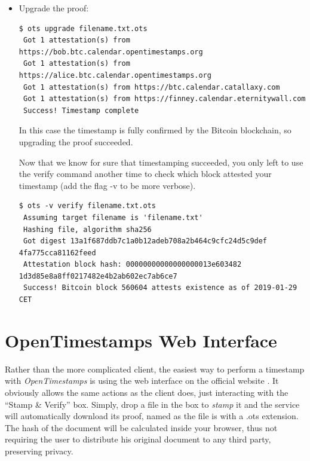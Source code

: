 \begin{itemize}
\begin{lstlisting}[breakatwhitespace=true]
\end{lstlisting}
Incomplete timestamps can be upgraded using the \colorbox{light-gray}{upgrade} command which adds the path to the relative block header merkleroot to the proof. Upgrading a proof isn't always available: there must be at least one completed attestation\footnote{That is, at least one of the four public calendars in question must have received an attestation from the Bitcoin blockchain.}.
\item Upgrade the proof: \bigskip
\begin{lstlisting}[breakatwhitespace=true]
 $ ots upgrade filename.txt.ots 
 Got 1 attestation(s) from https://bob.btc.calendar.opentimestamps.org
 Got 1 attestation(s) from https://alice.btc.calendar.opentimestamps.org
 Got 1 attestation(s) from https://btc.calendar.catallaxy.com
 Got 1 attestation(s) from https://finney.calendar.eternitywall.com
 Success! Timestamp complete
\end{lstlisting}
In this case the timestamp is fully confirmed by the Bitcoin blockchain, so upgrading the proof succeeded.

\bigskip
\noindent
Now that we know for sure that timestamping succeeded, you only left to use the \colorbox{light-gray}{verify} command another time to check which block attested your timestamp (add the flag \colorbox{light-gray}{-v} to be more verbose).\bigskip
\begin{lstlisting}[breakatwhitespace=true]
 $ ots -v verify filename.txt.ots
 Assuming target filename is 'filename.txt'
 Hashing file, algorithm sha256
 Got digest 13a1f687ddb7c1a0b12adeb708a2b464c9cfc24d5c9def 4fa775cca81162feed
 Attestation block hash: 00000000000000000013e603482 1d3d85e8a8ff0217482e4b2ab602ec7ab6ce7
 Success! Bitcoin block 560604 attests existence as of 2019-01-29 CET
\end{lstlisting}
\end{itemize}

\bigskip
\section{OpenTimestamps Web Interface}
\label{sec:ots-web}
Rather than the more complicated client, the easiest way to perform a timestamp with \textit{OpenTimestamps} is using the web interface on the official website \cite{OTSWeb}. It obviously allows the same actions as the client does, just interacting with the \enquote{Stamp \& Verify} box. Simply, drop a file in the box to \textit{stamp} it and the service will automatically download its proof, named as the file is with a \colorbox{light-gray}{.ots} extension. The hash of the document will be calculated inside your browser, thus not requiring the user to distribute his original document to any third party, preserving privacy.

